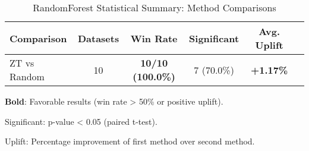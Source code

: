 \begin{table}[htbp]
\centering
\caption{RandomForest Statistical Summary: Method Comparisons}
\label{tab:randomforest_stats_summary}
\begin{tabular}{lccccc}
\toprule
Comparison & Datasets & Win Rate & Significant & Avg. Uplift \\
\midrule
ZT vs Random & 10 & \textbf{10/10 (100.0\%)} & 7 (70.0\%) & \textbf{+1.17\%} \\
\bottomrule
\end{tabular}
\begin{tablenotes}
\small
\item \textbf{Bold}: Favorable results (win rate > 50\% or positive uplift).
\item Significant: p-value < 0.05 (paired t-test).
\item Uplift: Percentage improvement of first method over second method.
\end{tablenotes}
\end{table}
